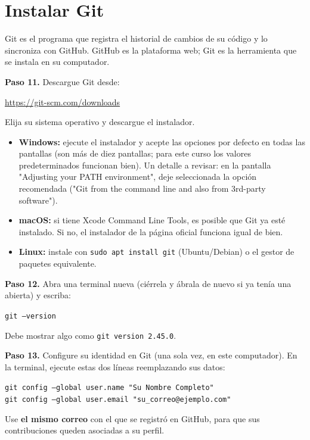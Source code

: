 \documentclass[11pt,a4paper]{article}
\newcommand{\code}[1]{\texttt{#1}}
\newcommand{\link}[1]{\url{#1}}
\begin{document}
\section{Instalar Git}

Git es el programa que registra el historial de cambios de su código y lo sincroniza con GitHub. GitHub es la plataforma web; Git es la herramienta que se instala en su computador.

\begin{stepbox}
\textbf{Paso 11.} Descargue Git desde:
\begin{center}\link{https://git-scm.com/downloads}\end{center}
Elija su sistema operativo y descargue el instalador.
\begin{itemize}
  \item \textbf{Windows:} ejecute el instalador y acepte las opciones por defecto en todas las pantallas (son más de diez pantallas; para este curso los valores predeterminados funcionan bien). Un detalle a revisar: en la pantalla "Adjusting your PATH environment", deje seleccionada la opción recomendada ("Git from the command line and also from 3rd-party software").
  \item \textbf{macOS:} si tiene Xcode Command Line Tools, es posible que Git ya esté instalado. Si no, el instalador de la página oficial funciona igual de bien.
  \item \textbf{Linux:} instale con \code{sudo apt install git} (Ubuntu/Debian) o el gestor de paquetes equivalente.
\end{itemize}
\end{stepbox}

\begin{verify}
\textbf{Paso 12.} Abra una terminal nueva (ciérrela y ábrala de nuevo si ya tenía una abierta) y escriba:
\begin{center}\code{git --version}\end{center}
Debe mostrar algo como \code{git version 2.45.0}.
\end{verify}

\begin{stepbox}
\textbf{Paso 13.} Configure su identidad en Git (una sola vez, en este computador). En la terminal, ejecute estas dos líneas reemplazando sus datos:
\begin{center}
\code{git config --global user.name "Su Nombre Completo"}\\
\code{git config --global user.email "su\_correo@ejemplo.com"}
\end{center}
Use \textbf{el mismo correo} con el que se registró en GitHub, para que sus contribuciones queden asociadas a su perfil.
\end{stepbox}
\end{document}
